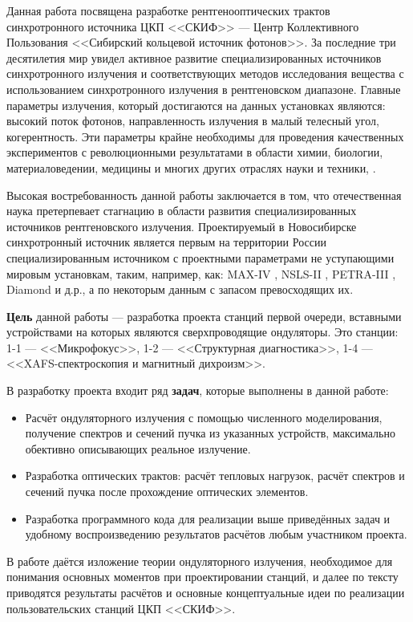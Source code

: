 {\actuality}
Данная работа посвящена разработке рентгенооптических трактов синхротронного источника ЦКП <<СКИФ>> --- Центр Коллективного Пользования <<Сибирский кольцевой источник фотонов>>. За последние три десятилетия мир увидел активное развитие специализированных источников синхротронного излучения и соответствующих методов исследования вещества с использованием синхротронного излучения в рентгеновском диапазоне. Главные параметры излучения, который достигаются на данных установках являются: высокий поток фотонов, направленность излучения в малый телесный угол, когерентность. Эти параметры крайне необходимы для проведения качественных экспериментов с революционными результатами в области химии, биологии, материаловедении, медицины и многих других отраслях науки и техники, \cite{willmott2019introduction}.

Высокая востребованность данной работы заключается в том, что отечественная наука претерпевает стагнацию в области развития специализированных источников рентгеновского излучения. Проектируемый в Новосибирске синхротронный источник является первым на территории России специализированным источником с проектными параметрами не уступающими мировым установкам, таким, например, как: MAX-IV \cite{max2010max}, NSLS-II \cite{NSLS}, PETRA-III \cite{balewski2004petra}, Diamond \cite{DIAMOND} и д.р., а по некоторым данным с запасом превосходящих их\cite{zorin2019radiation}.

\textbf{Цель} данной работы --- разработка проекта станций первой очереди, вставными устройствами на которых являются сверхпроводящие ондуляторы. Это станции: 1-1 --- <<Микрофокус>>, 1-2 --- <<Структурная диагностика>>, 1-4 --- <<XAFS-спектроскопия и магнитный дихроизм>>.  

В разработку проекта входит ряд \textbf{задач}, которые выполнены в данной работе:
\begin{itemize}

	\item Расчёт ондуляторного излучения с помощью численного моделирования, получение спектров и сечений пучка из указанных устройств, максимально обективно описывающих реальное излучение.
	\item Разработка оптических трактов: расчёт тепловых нагрузок, расчёт спектров и сечений пучка после прохождение оптических элементов. 
	\item Разработка программного кода для реализации выше приведённых задач и удобному воспроизведению результатов расчётов любым участником проекта.
\end{itemize}

В работе даётся изложение теории ондуляторного излучения, необходимое для понимания основных моментов при проектировании станций, и далее по тексту приводятся результаты расчётов и основные концептуальные идеи по реализации пользовательских станций ЦКП <<СКИФ>>.


